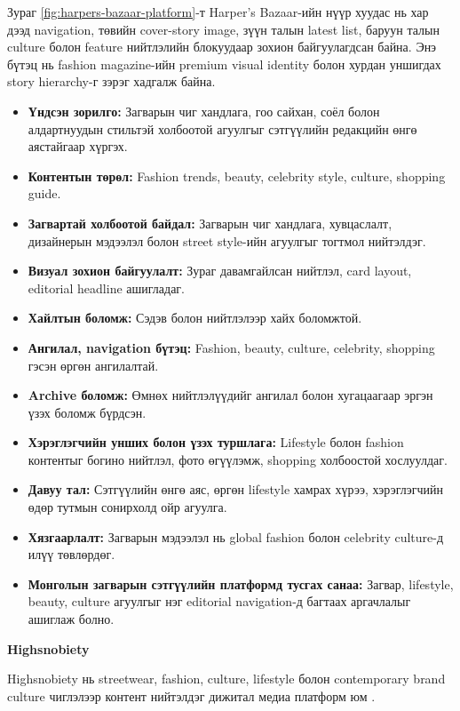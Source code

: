 Зураг \ref{fig:harpers-bazaar-platform}-т Harper's Bazaar-ийн нүүр хуудас нь хар дээд navigation, төвийн cover-story image, зүүн талын latest list, баруун талын culture болон feature нийтлэлийн блокуудаар зохион байгуулагдсан байна. Энэ бүтэц нь fashion magazine-ийн premium visual identity болон хурдан уншигдах story hierarchy-г зэрэг хадгалж байна.

\begin{itemize}
    \item \textbf{Үндсэн зорилго:} Загварын чиг хандлага, гоо сайхан, соёл болон алдартнуудын стильтэй холбоотой агуулгыг сэтгүүлийн редакцийн өнгө аястайгаар хүргэх.
    \item \textbf{Контентын төрөл:} Fashion trends, beauty, celebrity style, culture, shopping guide.
    \item \textbf{Загвартай холбоотой байдал:} Загварын чиг хандлага, хувцаслалт, дизайнерын мэдээлэл болон street style-ийн агуулгыг тогтмол нийтэлдэг.
    \item \textbf{Визуал зохион байгуулалт:} Зураг давамгайлсан нийтлэл, card layout, editorial headline ашигладаг.
    \item \textbf{Хайлтын боломж:} Сэдэв болон нийтлэлээр хайх боломжтой.
    \item \textbf{Ангилал, navigation бүтэц:} Fashion, beauty, culture, celebrity, shopping гэсэн өргөн ангилалтай.
    \item \textbf{Archive боломж:} Өмнөх нийтлэлүүдийг ангилал болон хугацаагаар эргэн үзэх боломж бүрдсэн.
    \item \textbf{Хэрэглэгчийн унших болон үзэх туршлага:} Lifestyle болон fashion контентыг богино нийтлэл, фото өгүүлэмж, shopping холбоостой хослуулдаг.
    \item \textbf{Давуу тал:} Сэтгүүлийн өнгө аяс, өргөн lifestyle хамрах хүрээ, хэрэглэгчийн өдөр тутмын сонирхолд ойр агуулга.
    \item \textbf{Хязгаарлалт:} Загварын мэдээлэл нь global fashion болон celebrity culture-д илүү төвлөрдөг.
    \item \textbf{Монголын загварын сэтгүүлийн платформд тусгах санаа:} Загвар, lifestyle, beauty, culture агуулгыг нэг editorial navigation-д багтаах аргачлалыг ашиглаж болно.
\end{itemize}

\textbf{Highsnobiety}

Highsnobiety нь streetwear, fashion, culture, lifestyle болон contemporary brand culture чиглэлээр контент нийтэлдэг дижитал медиа платформ юм \cite{highsnobiety_site}.

